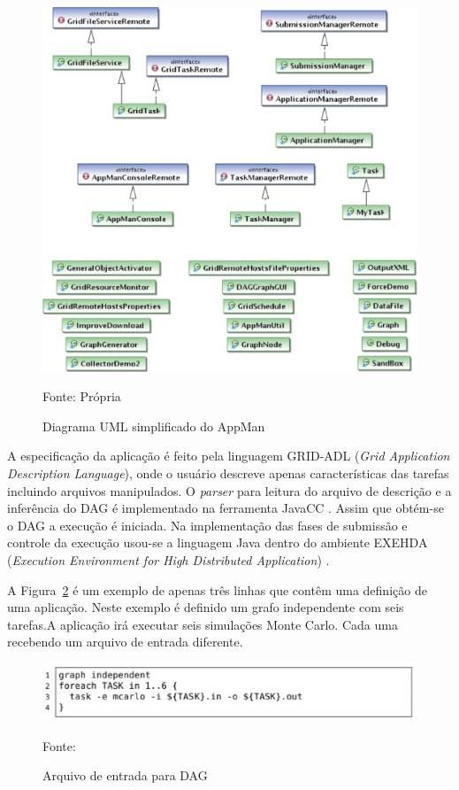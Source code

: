 \begin{figure}[htbp]
\begin{center}
\includegraphics[scale=0.5]{./img/UML-2.eps}
\caption{Diagrama UML simplificado do AppMan}
\label{fig:AppMan-UML}
Fonte: Própria
\end{center}
\end{figure}

\pagebreak

A especificação da aplicação é feito pela linguagem GRID-ADL (\emph{Grid Application Description Language}), onde o usuário descreve apenas características das tarefas incluindo arquivos manipulados. O \emph{parser} para leitura do arquivo de descrição e a inferência do DAG é implementado na ferramenta JavaCC \cite{javacc}. Assim que obtém-se o DAG a execução é iniciada. Na implementação das fases de submissão e controle da execução usou-se a linguagem Java dentro do ambiente EXEHDA (\emph{Execution Environment for High Distributed Application}) \cite{exehda}.

A Figura~\ref{fig:Arquivo_DAG} é um exemplo de apenas três linhas que contêm uma definição de uma aplicação. Neste exemplo é definido um grafo independente com seis tarefas.A aplicação irá executar seis simulações Monte Carlo. Cada uma recebendo um arquivo de entrada diferente.

\begin{figure}[h]
\begin{center}
\includegraphics[scale=0.7]{./img/grid-adl.eps}
\caption{Arquivo de entrada para DAG}
\label{fig:Arquivo_DAG}
Fonte: \cite{Mangan2006}
\end{center}
\end{figure}

